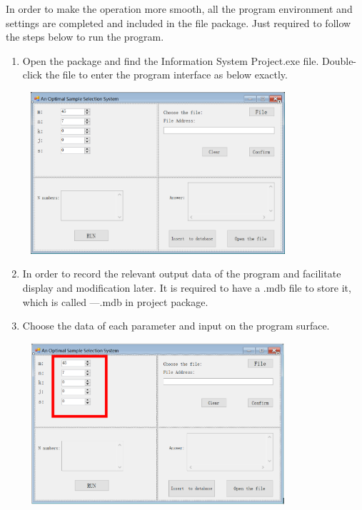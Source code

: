 In order to make the operation more smooth, all the program environment and settings are completed and included in the file package. Just required to follow the steps below to run the program.
\begin{enumerate}

\item Open the package and find the Information System Project.exe file. Double-click the file to enter the program interface as below exactly.
\begin{center}
    \includegraphics[width=10cm,height=6cm]{images/initial.png}
\end{center}

\item In order to record the relevant output data of the program and facilitate display and modification later. It is required to have a .mdb file to store it, which is called ---.mdb in project package.

\item Choose the data of each parameter and input on the program surface.
\begin{center}
    \includegraphics[width=10cm,height=6cm]{images/step1.PNG}
\end{center}


\end{enumerate}
